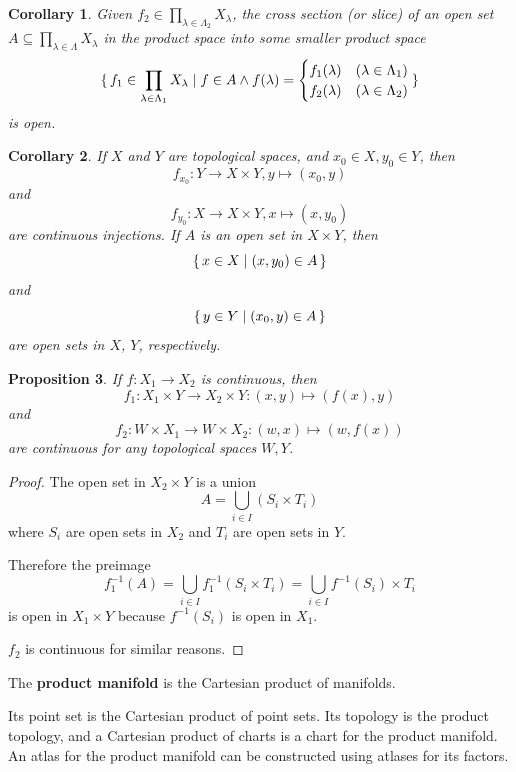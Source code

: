 \documentclass[12pt, letterpaper]{article}
\newtheorem{prop}{Proposition}[section]
\newtheorem{cor}[prop]{Corollary}
\theoremstyle{definition}
\theoremstyle{remark}
\theoremstyle{definition}
\theoremstyle{plain}
\numberwithin{equation}{section}
\begin{document}
	\begin{cor}
		Given $f_2\in \prod_{\lambda\in\Lambda_2} X_\lambda$, the cross section (or slice) of an open set
		$A\subseteq \prod_{\lambda\in\Lambda} X_\lambda$
		in the product space into some smaller product space
		\[ \set{ f_1 \in \prod_{\lambda\in\Lambda_1} X_\lambda | f\in A
			\land  f(\lambda)=\begin{cases}
				f_1(\lambda) & (\lambda\in\Lambda_1)\\
				f_2(\lambda) & (\lambda\in\Lambda_2)\\
		\end{cases} } \]
		is open.
	\end{cor}
	\begin{cor}\label{corContinuousInjection}
		If $X$ and $Y$ are topological spaces, and $x_0\in X,y_0\in Y$,
		then 
		\[ f_{x_0} \colon Y \to X\times Y, y\mapsto (x_0,y) \]
		and
		\[ f_{y_0} \colon X \to X\times Y, x\mapsto (x,y_0) \]
		are continuous injections.
		If $A$ is an open set in $X\times Y$, then
		\[ \set{ x\in X | (x,y_0) \in A} \]
		and
		\[ \set{ y\in Y | (x_0,y) \in A} \]
		are open sets in $X$, $Y$, respectively.
	\end{cor}

	\begin{prop}\label{propContinuousCartesianProduct}
		If $f\colon X_1\to X_2$ is continuous,
		then
		\[ f_1\colon X_1\times Y \to X_2 \times Y\colon  (x,y)\mapsto (f(x),y) \]
		and 
		\[ f_2\colon W\times X_1 \to W\times X_2 \colon  (w,x)\mapsto (w,f(x)) \]
		are continuous for any topological spaces $W,Y$.
	\end{prop}
	\begin{proof}
		The open set in $X_2\times Y$ is a union
		\[ A=\bigcup_{i\in I} (S_i \times T_i) \]
		where $S_i$ are open sets in $X_2$ and $T_i$ are open sets in $Y$.
		
		Therefore the preimage
		\[ f_{1}^{-1}(A) =\bigcup_{i\in I} f_1^{-1}(S_i \times T_i) =\bigcup_{i\in I} f^{-1}(S_i) \times T_i \]
		is open in $X_1\times Y$ because $f^{-1}(S_i) $ is open in $X_1$.
		
		$f_2$ is continuous for similar reasons.
	\end{proof}
	
	\begin{def*}
		The \textbf{product manifold} 
		is the Cartesian product of manifolds.
		
		Its point set is the Cartesian product of point sets.
		Its topology is the product topology,
		and a Cartesian product of charts is a chart for the product manifold.		
		An atlas for the product manifold can be constructed using atlases for its factors.
	\end{def*}
	
\end{document}
